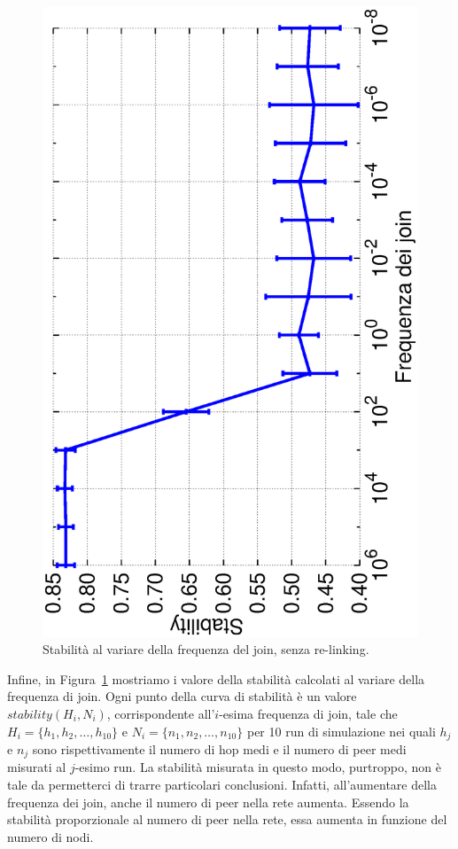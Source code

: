 \documentclass[prodmode,acmtap]{acmlarge}
\begin{document}
\begin{figure}	
\centering
	\includegraphics[scale=.45, angle=-90]{imgs/norelink-freq-stability.eps}
\caption{Stabilità al variare della frequenza del join, senza re-linking.}
\label{img:stabilita2}
\end{figure}

Infine, in Figura~\ref{img:stabilita2} mostriamo i valore della stabilità calcolati al variare della frequenza di join. Ogni punto della curva di stabilità è un valore $stability(H_i,N_i)$, corrispondente all'$i$-esima frequenza di join, tale che $H_i = \{ h_1, h_2, \dots, h_{10} \}$ e $N_i = \{ n_1, n_2, \dots, n_{10} \}$ per 10 run di simulazione nei quali $h_j$ e $n_j$ sono rispettivamente il numero di hop medi e il numero di peer medi misurati al $j$-esimo run. La stabilità misurata in questo modo, purtroppo, non è tale da permetterci di trarre particolari conclusioni. Infatti, all'aumentare della frequenza dei join, anche il numero di peer nella rete aumenta. Essendo la stabilità proporzionale al numero di peer nella rete, essa aumenta in funzione del numero di nodi.
\end{document}
